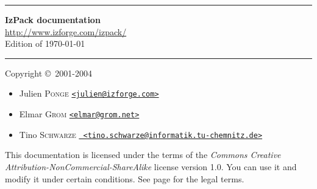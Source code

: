 \begin{titlepage}

\begin{center}
\hrule
\vspace{2em}
\Huge
\textbf{IzPack documentation}\\[2em]
\normalsize
\href{http://www.izforge.com/izpack/}{\url{http://www.izforge.com/izpack/}}\\[2em]
Edition of \today \\[2em]
\hrule
\end{center}

\vfill
\noindent Copyright \copyright\ 2001-2004
\begin{itemize}
\item Julien \textsc{Ponge} \href{mailto:julien@izforge.com}{\texttt{<julien@izforge.com>}}
\item Elmar \textsc{Grom} \href{mailto:elmar@grom.net}{\texttt{<elmar@grom.net>}} 
\item Tino \textsc{Schwarze} \href{mailto:tino.schwarze@informatik.tu-chemnitz.de}{\texttt{
                             <tino.schwarze@informatik.tu-chemnitz.de>}}
\end{itemize}

\vfill
\noindent
This documentation is licensed under the terms of the \textit{Commons Creative 
Attribution-NonCommercial-ShareAlike} license version 1.0. You can use it and
modify it under certain conditions. See page \pageref{CC-license} for the
legal terms.

\end{titlepage}

